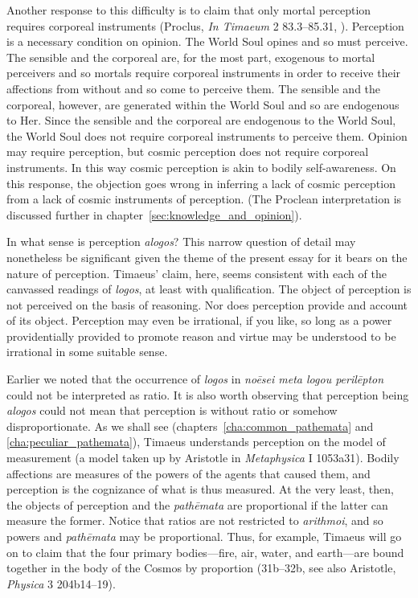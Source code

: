 Another response to this difficulty is to claim that only mortal perception requires corporeal instruments (Proclus, \emph{In Timaeum} 2 83.3–85.31, \citealt{Diehl:1903re}). Perception is a necessary condition on opinion. The World Soul opines and so must perceive. The sensible and the corporeal are, for the most part, exogenous to mortal perceivers and so mortals require corporeal instruments in order to receive their affections from without and so come to perceive them. The sensible and the corporeal, however, are generated within the World Soul and so are endogenous to Her. Since the sensible and the corporeal are endogenous to the World Soul, the World Soul does not require corporeal instruments to perceive them. Opinion may require perception, but cosmic perception does not require corporeal instruments. In this way cosmic perception is akin to bodily self-awareness. On this response, the objection goes wrong in inferring a lack of cosmic perception from a lack of cosmic instruments of perception. (The Proclean interpretation is discussed further in chapter~\ref{sec:knowledge_and_opinion}).

In what sense is perception \emph{alogos}? This narrow question of detail may nonetheless be significant given the theme of the present essay for it bears on the nature of perception. Timaeus' claim, here, seems consistent with each of the canvassed readings of \emph{logos}, at least with qualification. The object of perception is not perceived on the basis of reasoning. Nor does perception provide and account of its object. Perception may even be irrational, if you like, so long as a power providentially provided to promote reason and virtue may be understood to be irrational in some suitable sense. 

Earlier we noted that the occurrence of \emph{logos} in \emph{noēsei meta logou perilēpton} could not be interpreted as ratio. It is also worth observing that perception being \emph{alogos} could not mean that perception is without ratio or somehow disproportionate. As we shall see (chapters~\ref{cha:common_pathemata} and \ref{cha:peculiar_pathemata}), Timaeus understands perception on the model of measurement (a model taken up by Aristotle in \emph{Metaphysica} I 1053a31). Bodily affections are measures of the powers of the agents that caused them, and perception is the cognizance of what is thus measured. At the very least, then, the objects of perception and the \emph{pathēmata} are proportional if the latter can measure the former. Notice that ratios are not restricted to \emph{arithmoi}, and so powers and \emph{pathēmata} may be proportional. Thus, for example, Timaeus will go on to claim that the four primary bodies---fire, air, water, and earth---are bound together in the body of the Cosmos by proportion (31b--32b, see also Aristotle, \emph{Physica} 3 204b14–19).

